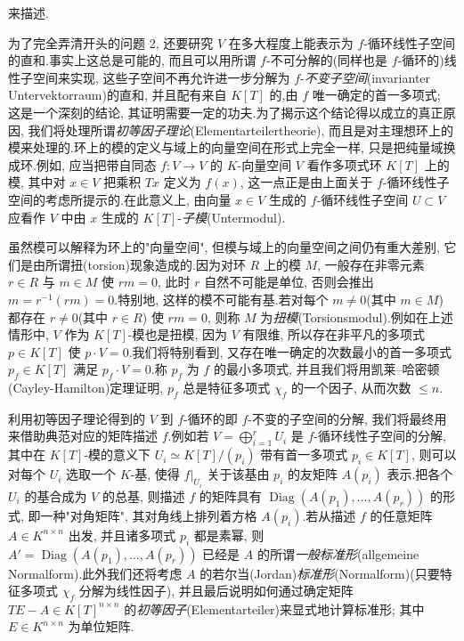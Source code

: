 来描述.

为了完全弄清开头的问题 2, 还要研究 $V$ 在多大程度上能表示为 $f$-循环线性子空间的直和.事实上这总是可能的, 而且可以用所谓 $f$-不可分解的(同样也是 $f$-循环的)线性子空间来实现, 这些子空间不再允许进一步分解为 $f$-\emph{不变子空间}(\textup{invarianter Untervektorraum})的直和, 并且配有来自 $K[T]$ 的,由 $f$ 唯一确定的首一多项式; 这是一个深刻的结论, 其证明需要一定的功夫.为了揭示这个结论得以成立的真正原因, 我们将处理所谓\emph{初等因子理论}(\textup{Elementarteilertheorie}), 而且是对主理想环上的模来处理的.环上的模的定义与域上的向量空间在形式上完全一样, 只是把纯量域换成环.例如, 应当把带自同态 $f \colon V \longrightarrow V$ 的 $K$-向量空间 $V$ 看作多项式环 $K[T]$ 上的模, 其中对 $x \in V$ 把乘积 $Tx$ 定义为 $f(x)$, 这一点正是由上面关于 $f$-循环线性子空间的考虑所提示的.在此意义上, 由向量 $x \in V$ 生成的 $f$-循环线性子空间 $U \subset V$ 应看作 $V$ 中由 $x$ 生成的 $K[T]$-\emph{子模}(\textup{Untermodul}).

虽然模可以解释为环上的"向量空间", 但模与域上的向量空间之间仍有重大差别, 它们是由所谓扭(torsion)现象造成的.因为对环 $R$ 上的模 $M$, 一般存在非零元素 $r \in R$ 与 $m \in M$ 使 $rm = 0$, 此时 $r$ 自然不可能是单位, 否则会推出 $m = r^{-1}(rm) = 0$.特别地, 这样的模不可能有基.若对每个 $m \neq 0$(其中 $m \in M$) 都存在 $r \neq 0$(其中 $r \in R$) 使 $rm = 0$, 则称 $M$ 为\emph{扭模}(\textup{Torsionsmodul}).例如在上述情形中, $V$ 作为 $K[T]$-模也是扭模, 因为 $V$ 有限维, 所以存在非平凡的多项式 $p \in K[T]$ 使 $p \cdot V = 0$.我们将特别看到, 又存在唯一确定的次数最小的首一多项式 $p_f \in K[T]$ 满足 $p_f \cdot V = 0$.称 $p_f$ 为 $f$ 的最小多项式, 并且我们将用凯莱--哈密顿(Cayley-Hamilton)定理证明, $p_f$ 总是特征多项式 $\chi_f$ 的一个因子, 从而次数 $\leq n$.

利用初等因子理论得到的 $V$ 到 $f$-循环的即 $f$-不变的子空间的分解, 我们将最终用来借助典范对应的矩阵描述 $f$.例如若 $V = \bigoplus_{i = 1}^{r} U_i$ 是 $f$-循环线性子空间的分解, 其中在 $K[T]$-模的意义下 $U_i \simeq K[T]/(p_i)$ 带有首一多项式 $p_i \in K[T]$, 则可以对每个 $U_i$ 选取一个 $K$-基, 使得 $f|_{U_i}$ 关于该基由 $p_i$ 的友矩阵 $A(p_i)$ 表示.把各个 $U_i$ 的基合成为 $V$ 的总基, 则描述 $f$ 的矩阵具有 $\operatorname{Diag}(A(p_1), \ldots, A(p_r))$ 的形式, 即一种"对角矩阵", 其对角线上排列着方格 $A(p_i)$.若从描述 $f$ 的任意矩阵 $A \in K^{n \times n}$ 出发, 并且诸多项式 $p_i$ 都是素幂, 则 $A' = \operatorname{Diag}(A(p_1), \ldots, A(p_r))$ 已经是 $A$ 的所谓\emph{一般标准形}(\textup{allgemeine Normalform}).此外我们还将考虑 $A$ 的若尔当(Jordan)\emph{标准形}(\textup{Normalform})(只要特征多项式 $\chi_f$ 分解为线性因子), 并且最后说明如何通过确定矩阵 $TE - A \in K[T]^{n \times n}$ 的\emph{初等因子}(\textup{Elementarteiler})来显式地计算标准形; 其中 $E \in K^{n \times n}$ 为单位矩阵.

